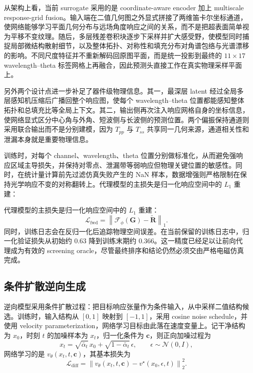 从架构上看，当前 surrogate 采用的是 coordinate-aware encoder 加上 multiscale response-grid fusion。输入端在二值几何图之外显式拼接了两维笛卡尔坐标通道，使网络能够学习平面几何分布与远场角度响应之间的关系，而不是把超表面简单视为平移不变纹理。随后，多层残差卷积块逐步下采样并扩大感受野，使模型同时捕捉局部微结构散射细节，以及整体拓扑、对称性和填充分布对角谱包络与光谱漂移的影响。不同尺度特征并不重新解码回原图平面，而是统一投影到最终的 $11\times17$ wavelength--theta 标签网格上再融合，因此预测头直接工作在真实物理采样平面上。

另外两个设计点进一步补足了器件级物理信息。其一，最深层 latent 经过全局多层感知机压缩后广播回整个响应图，使每个 wavelength--theta 位置都能感知整体拓扑和总填充比等全局上下文。其二，输出侧再次注入响应网格自身的坐标信息，使网络显式区分中心角与外角、短波侧与长波侧的预测位置。两个偏振保持通道则采用联合输出而不是分别建模，因为 $T_{pp}$ 与 $T_{ss}$ 共享同一几何来源，通道相关性和泄漏本身就是重要物理信息。

训练时，对每个 channel、wavelength、theta 位置分别做标准化，从而避免强响应区域主导损失，并保持对零点、泄漏带等弱响应但物理关键位置的敏感性。同时，在统计量计算前先过滤仿真失败产生的 NaN 样本，数据增强则严格限制在保持光学响应不变的对称翻转上。代理模型的主损失是归一化响应空间中的 $L_1$ 重建：

代理模型的主损失是归一化响应空间中的 $L_1$ 重建：
\begin{equation}
\mathcal{L}_{\mathrm{fwd}}=\left\|\mathcal{F}_{\phi}(\mathbf{G})-\widetilde{\mathbf{R}}\right\|_{1}.
\end{equation}
同时，训练日志会在反归一化后追踪物理空间误差。在当前保留的训练日志中，归一化验证损失从初始约 $0.63$ 降到训练末期约 $0.366$。这一精度已经足以让前向代理成为有效的 screening oracle，尽管最终排序和结论仍然必须交由严格电磁仿真完成。

\subsection{条件扩散逆向生成}

逆向模型采用条件扩散过程：把目标响应张量作为条件输入，从中采样二值结构候选。训练时，输入结构从 $[0,1]$ 映射到 $[-1,1]$，采用 cosine noise schedule，并使用 velocity parameterization，网络学习目标由此落在速度变量上。记干净结构为 $x_0$，时刻 $t$ 的加噪样本为 $x_t$，归一化条件为 $\mathbf{c}$，则正向加噪过程为
\begin{equation}
x_t=\sqrt{\bar{\alpha}_t}\,x_0+\sqrt{1-\bar{\alpha}_t}\,\epsilon,\qquad \epsilon\sim\mathcal{N}(0,I),
\end{equation}
网络学习的是 $v_{\theta}(x_t,t,\mathbf{c})$，其基本损失为
\begin{equation}
\mathcal{L}_{\mathrm{diff}}=\left\|v_{\theta}(x_t,t,\mathbf{c})-v^{\star}(x_0,\epsilon,t)\right\|_2^2.
\end{equation}

